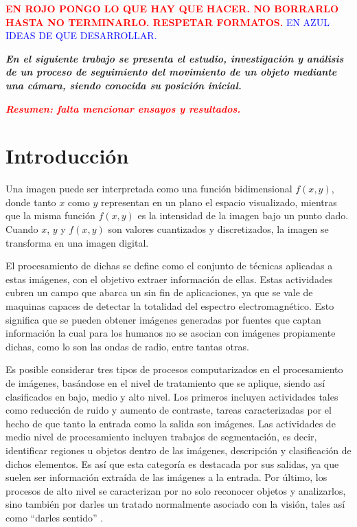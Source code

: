 








\begin{center}
	\Large{\textcolor{red}{\textbf{EN ROJO PONGO LO QUE HAY QUE HACER. NO BORRARLO HASTA NO TERMINARLO. RESPETAR FORMATOS.}} \textcolor{blue}{EN AZUL IDEAS DE QUE DESARROLLAR.}}
\end{center}

\textbf{\textit{En el siguiente trabajo se presenta el estudio, investigación y análisis de un proceso de seguimiento del movimiento de un objeto mediante una cámara, siendo conocida su posición inicial.}}


\textcolor{red}{\textbf{\textit{Resumen: falta mencionar ensayos y resultados.}}}

\section{Introducción}
Una imagen puede ser interpretada como una función bidimensional $f\left( x, y\right)$, donde tanto $x$ como $y$ representan en un plano el espacio visualizado, mientras que la misma función $f\left( x, y\right)$ es la intensidad de la imagen bajo un punto dado. Cuando $x$, $y$ y $f\left( x, y\right)$ son valores cuantizados y discretizados, la imagen se transforma en una imagen digital.
	 	
El procesamiento de dichas se define como el conjunto de técnicas aplicadas a estas imágenes, con el objetivo extraer información de ellas. Estas actividades cubren un campo que abarca un sin fin de aplicaciones, ya que se vale de maquinas capaces de detectar la totalidad del espectro electromagnético. Esto significa que se pueden obtener imágenes generadas por fuentes que captan información la cual para los humanos no se asocian con imágenes propiamente dichas, como lo son las ondas de radio, entre tantas otras.
	
Es posible considerar tres tipos de procesos computarizados en el procesamiento de imágenes, basándose en el nivel de tratamiento que se aplique, siendo así clasificados en bajo, medio y alto nivel. Los primeros incluyen actividades tales como reducción de ruido y aumento de contraste, tareas caracterizadas por el hecho de que tanto la entrada como la salida son imágenes. Las actividades de medio nivel de procesamiento incluyen trabajos de segmentación, es decir, identificar regiones u objetos dentro de las imágenes, descripción y clasificación de dichos elementos. Es así que esta categoría es destacada por sus salidas, ya que suelen ser información extraída de las imágenes a la entrada. Por último, los procesos de alto nivel se caracterizan por no solo reconocer objetos y analizarlos, sino también por darles un tratado normalmente asociado con la visión, tales así como ``darles sentido'' \cite{ref:intro1}.
	
